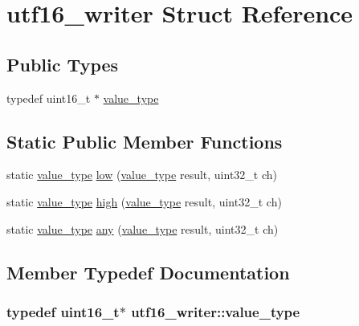 \hypertarget{structutf16__writer}{
\section{utf16\_\-writer Struct Reference}
\label{structutf16__writer}
}
\subsection*{Public Types}
\begin{DoxyCompactItemize}
\item 
typedef uint16\_\-t $\ast$ \hyperlink{structutf16__writer_a527b705eaf5099167b8bc42423ce918c}{value\_\-type}
\end{DoxyCompactItemize}
\subsection*{Static Public Member Functions}
\begin{DoxyCompactItemize}
\item 
static \hyperlink{structutf16__writer_a527b705eaf5099167b8bc42423ce918c}{value\_\-type} \hyperlink{structutf16__writer_ab11fef721a8b38de5e315d2e75d12956}{low} (\hyperlink{structutf16__writer_a527b705eaf5099167b8bc42423ce918c}{value\_\-type} result, uint32\_\-t ch)
\item 
static \hyperlink{structutf16__writer_a527b705eaf5099167b8bc42423ce918c}{value\_\-type} \hyperlink{structutf16__writer_a01b6ce1a567dea11daead3ca83f42d5c}{high} (\hyperlink{structutf16__writer_a527b705eaf5099167b8bc42423ce918c}{value\_\-type} result, uint32\_\-t ch)
\item 
static \hyperlink{structutf16__writer_a527b705eaf5099167b8bc42423ce918c}{value\_\-type} \hyperlink{structutf16__writer_ac14e06db126fbbef4be7efdb80fbdf4a}{any} (\hyperlink{structutf16__writer_a527b705eaf5099167b8bc42423ce918c}{value\_\-type} result, uint32\_\-t ch)
\end{DoxyCompactItemize}


\subsection{Member Typedef Documentation}
\hypertarget{structutf16__writer_a527b705eaf5099167b8bc42423ce918c}{
\subsubsection[{value\_\-type}]{\setlength{\rightskip}{0pt plus 5cm}typedef uint16\_\-t$\ast$ {\bf utf16\_\-writer::value\_\-type}}}
\label{structutf16__writer_a527b705eaf5099167b8bc42423ce918c}


